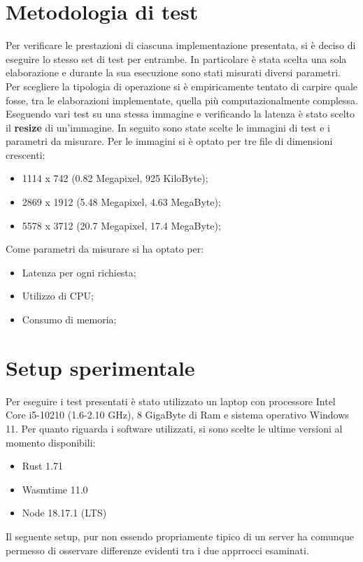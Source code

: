 \section{Metodologia di test}
Per verificare le prestazioni di ciascuna implementazione presentata, si è deciso di eseguire lo stesso set di test per entrambe.
In particolare è stata scelta una sola elaborazione e durante la sua esecuzione sono stati misurati diversi parametri.
Per scegliere la tipologia di operazione si è empiricamente tentato di carpire quale fosse, tra le elaborazioni implementate, quella più computazionalmente complessa.
Eseguendo vari test su una stessa immagine e verificando la latenza è stato scelto il \textbf{resize} di un'immagine.
In seguito sono state scelte le immagini di test e i parametri da misurare.
Per le immagini si è optato per tre file di dimensioni crescenti:
\begin{itemize}
    \item 1114 x 742 (0.82 Megapixel, 925 KiloByte);
    \item 2869 x 1912 (5.48 Megapixel, 4.63 MegaByte);
    \item 5578 x 3712 (20.7 Megapixel, 17.4 MegaByte);
\end{itemize}
Come parametri da misurare si ha optato per:
\begin{itemize}
    \item Latenza per ogni richiesta;
    \item Utilizzo di CPU;
    \item Consumo di memoria;
\end{itemize}
\section{Setup sperimentale}
Per eseguire i test presentati è stato utilizzato un laptop con processore Intel Core i5-10210 (1.6-2.10 GHz), 8 GigaByte di Ram e sistema operativo Windows 11.
Per quanto riguarda i software utilizzati, si sono scelte le ultime versioni al momento disponibili:
\begin{itemize}
    \item Rust 1.71
    \item Wasmtime 11.0
    \item Node 18.17.1 (LTS)
\end{itemize}
Il seguente setup, pur non essendo propriamente tipico di un server ha comunque permesso di osservare differenze evidenti tra i due apprrocci esaminati.
\newpage
